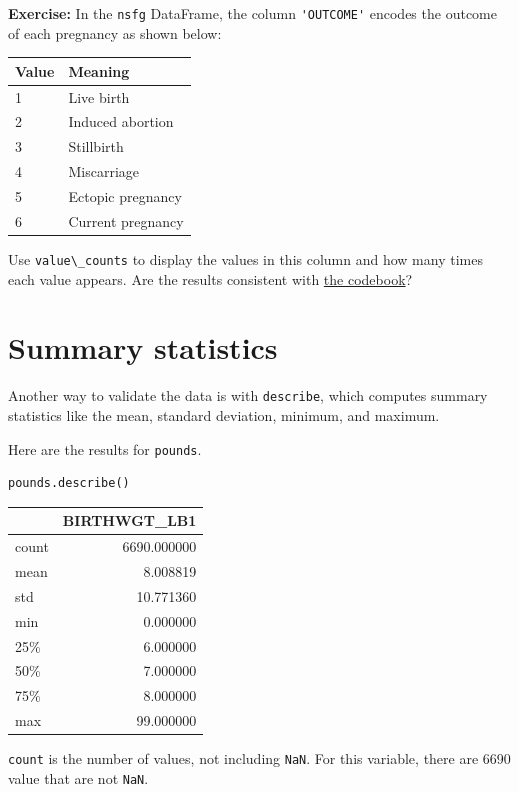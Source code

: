 \textbf{Exercise:} In the \passthrough{\lstinline!nsfg!} DataFrame, the
column \passthrough{\lstinline!'OUTCOME'!} encodes the outcome of each
pregnancy as shown below:

\begin{longtable}[]{@{}ll@{}}
\toprule
Value & Meaning\tabularnewline
\midrule
\endhead
1 & Live birth\tabularnewline
2 & Induced abortion\tabularnewline
3 & Stillbirth\tabularnewline
4 & Miscarriage\tabularnewline
5 & Ectopic pregnancy\tabularnewline
6 & Current pregnancy\tabularnewline
\bottomrule
\end{longtable}

Use \passthrough{\lstinline!value\_counts!} to display the values in
this column and how many times each value appears. Are the results
consistent with
\href{https://github.com/AllenDowney/ElementsOfDataScience/raw/master/data/2015-2017_NSFG_FemPregFile_Codebook-508.pdf}{the
codebook}?

\hypertarget{summary-statistics}{%
\section{Summary statistics}\label{summary-statistics}}

Another way to validate the data is with
\passthrough{\lstinline!describe!}, which computes summary statistics
like the mean, standard deviation, minimum, and maximum.

Here are the results for \passthrough{\lstinline!pounds!}.

\begin{lstlisting}[language=Python]
pounds.describe()
\end{lstlisting}

\begin{tabular}{lr}
\toprule
{} &  BIRTHWGT\_LB1 \\
\midrule
count &   6690.000000 \\
mean  &      8.008819 \\
std   &     10.771360 \\
min   &      0.000000 \\
25\%   &      6.000000 \\
50\%   &      7.000000 \\
75\%   &      8.000000 \\
max   &     99.000000 \\
\bottomrule
\end{tabular}

\passthrough{\lstinline!count!} is the number of values, not including
\passthrough{\lstinline!NaN!}. For this variable, there are 6690 value
that are not \passthrough{\lstinline!NaN!}.

